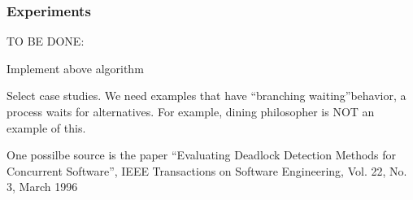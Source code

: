 \subsubsection{Experiments}

TO BE DONE:
\bn

\item Implement above algorithm

\item Select case studies. We need examples that have ``branching
waiting''behavior, \ie a process waits for alternatives. For example,
dining philosopher is NOT an example of this. 

One possilbe source is the paper 
``Evaluating Deadlock Detection Methods for Concurrent Software'', 
IEEE Transactions on Software Engineering, Vol. 22, No. 3, March 1996

\en



